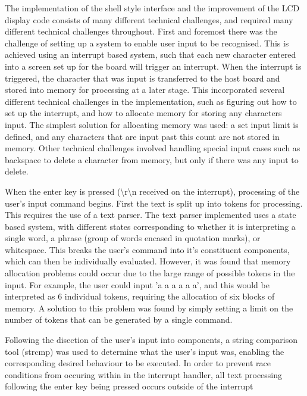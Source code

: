 The implementation of the shell style interface and the improvement of the LCD 
display code consists of many different technical challenges, and required many 
different technical challenges throughout. First and foremost there was the 
challenge of setting up a system to enable user input to be recognised. This is 
achieved using an interrupt based system, such that each new character entered 
into a screen set up for the board will trigger an interrupt. When the 
interrupt is triggered, the character that was input is transferred to the host 
board and stored into memory for processing at a later stage. This incorporated 
several different technical challenges in the implementation, such as figuring 
out how to set up the interrupt, and how to allocate memory for storing any 
characters input. The simplest solution for allocating memory was used: a set 
input limit is defined, and any characters that are input past this count are 
not stored in memory. Other technical challenges involved handling special input 
cases such as backspace to delete a character from memory, but only if there 
was any input to delete. 
\par\bigskip\noindent
When the enter key is pressed (\textbackslash r\textbackslash n received on 
the interrupt), processing of the user's input command begins. 
First the text is split up into tokens for processing. This 
requires the use of a text parser. The text parser implemented uses a state 
based system, with different states corresponding to whether it is interpreting 
a single word, a phrase (group of words encased in quotation marks), or 
whitespace. This breaks the user's command into it's constituent components, 
which can then be individually evaluated. However, it was found that memory 
allocation problems could occur due to the large range of possible tokens in 
the input. For example, the user could input 'a a a a a a', and this would be 
interpreted as 6 individual tokens, requiring the allocation of six blocks of 
memory. A solution to this problem was found by simply setting a limit on the 
number of tokens that can be generated by a single command. 
\par\bigskip\noindent
Following the disection of the user's input into components, a string 
comparison tool (strcmp) was used to determine what the user's input was, 
enabling the corresponding desired behaviour to be executed. In order to 
prevent race conditions from occuring within in the interrupt handler, all text 
processing following the enter key being pressed occurs outside of the interrupt 
